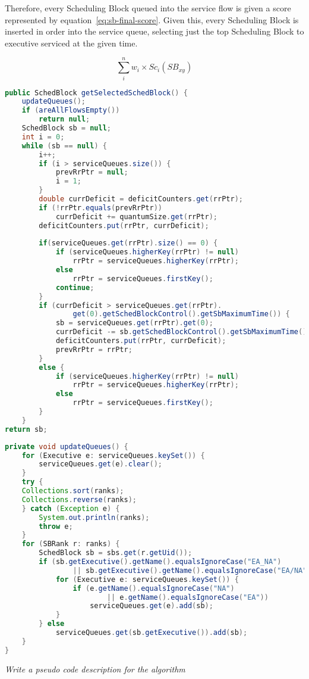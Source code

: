 Therefore, every Scheduling Block queued into the service flow is given a score represented by equation~\ref{eq:sb-final-score}. Given this, every Scheduling Block is inserted in order into the service queue, selecting just the top Scheduling Block to executive serviced at the given time.

\begin{equation}
\label{eq:sb-final-score}
\sum_{i}^{n} w_i\times Sc_i(SB_{xy})
\end{equation}

\begin{lstlisting}[language=Java]
public SchedBlock getSelectedSchedBlock() {
	updateQueues();
	if (areAllFlowsEmpty())
		return null;
	SchedBlock sb = null;
	int i = 0;
	while (sb == null) {
		i++;
		if (i > serviceQueues.size()) {
			prevRrPtr = null;
			i = 1;
		}
		double currDeficit = deficitCounters.get(rrPtr);
		if (!rrPtr.equals(prevRrPtr))
			currDeficit += quantumSize.get(rrPtr);
		deficitCounters.put(rrPtr, currDeficit);
		
		if(serviceQueues.get(rrPtr).size() == 0) {
			if (serviceQueues.higherKey(rrPtr) != null)
				rrPtr = serviceQueues.higherKey(rrPtr);
			else
				rrPtr = serviceQueues.firstKey();
			continue;
		}
		if (currDeficit > serviceQueues.get(rrPtr).
				get(0).getSchedBlockControl().getSbMaximumTime()) {
			sb = serviceQueues.get(rrPtr).get(0);
			currDeficit -= sb.getSchedBlockControl().getSbMaximumTime();
			deficitCounters.put(rrPtr, currDeficit);
			prevRrPtr = rrPtr;
		}
		else {
			if (serviceQueues.higherKey(rrPtr) != null)
				rrPtr = serviceQueues.higherKey(rrPtr);
			else
				rrPtr = serviceQueues.firstKey();
		}
	}
return sb;
\end{lstlisting}

\begin{lstlisting}[language=Java]
private void updateQueues() {
	for (Executive e: serviceQueues.keySet()) {
		serviceQueues.get(e).clear();
	}
	try {
	Collections.sort(ranks);
	Collections.reverse(ranks);
	} catch (Exception e) {
		System.out.println(ranks);
		throw e;
	}
	for (SBRank r: ranks) {
		SchedBlock sb = sbs.get(r.getUid());
		if (sb.getExecutive().getName().equalsIgnoreCase("EA_NA") 
				|| sb.getExecutive().getName().equalsIgnoreCase("EA/NA")) {
			for (Executive e: serviceQueues.keySet()) {
				if (e.getName().equalsIgnoreCase("NA") 
						|| e.getName().equalsIgnoreCase("EA"))
					serviceQueues.get(e).add(sb);
			}
		} else 
			serviceQueues.get(sb.getExecutive()).add(sb);
	}
}
\end{lstlisting}
\textit{Write a pseudo code description for the algorithm}

